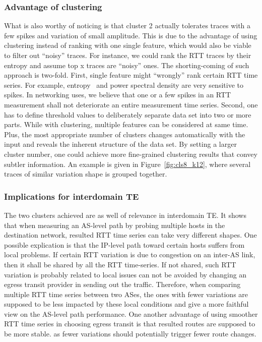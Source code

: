 \subsubsection{Advantage of clustering}
What is also worthy of noticing is that cluster 2 actually tolerates traces with a few spikes and variation of small amplitude. 
This is due to the advantage of using clustering instead of ranking with one single feature, which would also be viable to filter out ``noisy'' traces. 
For instance, we could rank the RTT traces by their entropy and assume top x traces are ``noisy'' ones. 
The shorting-coming of such approach is two-fold.
First, single feature might ``wrongly'' rank certain RTT time series. 
For example, entropy~\cite{Molina-Pico2011} and power spectral density are very sensitive to spikes. 
In networking uses, we believe that one or a few spikes in an RTT measurement shall not deteriorate an entire measurement time series. 
Second, one has to define threshold values to deliberately separate data set into two or more parts. 
While with clustering, multiple features can be considered at same time. 
Plus, the most appropriate number of clusters changes automatically with the input and reveals the inherent structure of the data set. 
By setting a larger cluster number, one could achieve more fine-grained clustering results that convey subtler information. An example is given in Figure~\ref{fig:cls8_k12}, where several traces of similar variation shape is grouped together.

\subsubsection{Implications for interdomain TE}
The two clusters achieved are as well of relevance in interdomain TE. 
It shows that when measuring an AS-level path by probing multiple hosts in the destination network, resulted RTT time series can take very different shapes. 
One possible explication is that the IP-level path toward certain hosts suffers from local problems.
If certain RTT variation is due to congestion on an inter-AS link, then it shall be shared by all the RTT time-series. If not shared, such RTT variation is probably related to local issues can not be avoided by changing an egress transit provider in sending out the traffic.
Therefore, when comparing multiple RTT time series between two ASes, the ones with fewer variations are supposed to be less impacted by these local conditions and give a more faithful view on the AS-level path performance.
One another advantage of using smoother RTT time series in choosing egress transit is that resulted routes are supposed to be more stable. as fewer variations should potentially trigger fewer route changes. 

